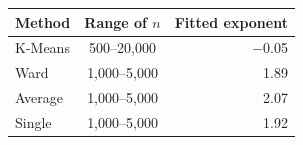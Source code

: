 \begin{tabular}{lcr}
\toprule
\textbf{Method} & \textbf{Range of $n$} & \textbf{Fitted exponent} \\
\midrule
K-Means & 500--20,000 & $-$0.05 \\
Ward & 1,000--5,000 & 1.89 \\
Average & 1,000--5,000 & 2.07 \\
Single & 1,000--5,000 & 1.92 \\
\bottomrule
\end{tabular}
